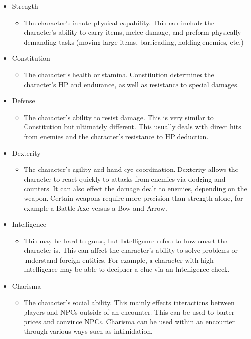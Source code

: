 \documentclass[12pt,a4paper]{report}
\begin{document}
		\begin{itemize}
			\item Strength
			\begin{itemize}
				\item The character's innate physical capability. This can include the character's ability to carry items, melee damage, and preform physically demanding tasks (moving large items, barricading, holding enemies, etc.)
			\end{itemize}
			\item Constitution
			\begin{itemize}
				\item The character's health or stamina. Constitution determines the character's HP and endurance, as well as resistance to special damages. 
			\end{itemize}
			\item Defense
			\begin{itemize}
				\item The character's ability to resist damage. This is very similar to Constitution but ultimately different. This usually deals with direct hits from enemies and the character's resistance to HP deduction.
			\end{itemize}
			\item Dexterity
			\begin{itemize}
				\item The character's agility and hand-eye coordination. Dexterity allows the character to react quickly to attacks from enemies via dodging and counters. It can also effect the damage dealt to enemies, depending on the weapon. Certain weapons require more precision than strength alone, for example a Battle-Axe versus a Bow and Arrow.
			\end{itemize}
			\item Intelligence
			\begin{itemize}
				\item This may be hard to guess, but Intelligence refers to how smart the character is. This can affect the character's ability to solve problems or understand foreign entities. For example, a character with high Intelligence may be able to decipher a clue via an Intelligence check.
			\end{itemize}
			\item Charisma
			\begin{itemize}
				\item The character's social ability. This mainly effects interactions between players and NPCs outside of an encounter. This can be used to barter prices and convince NPCs. Charisma can be used within an encounter through various ways such as intimidation. 

\end{itemize}
\end{itemize}
\end{document}
